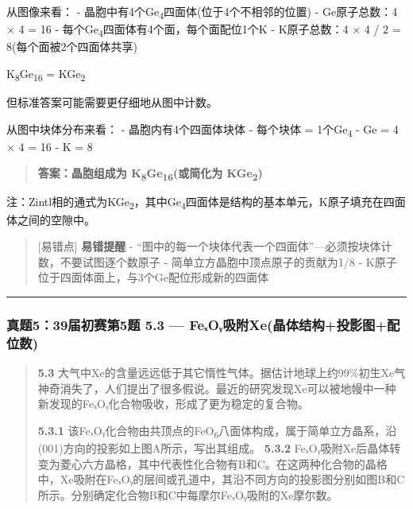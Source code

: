 从图像来看：
- 晶胞中有4个Ge\textsubscript{4}四面体(位于4个不相邻的位置)
- Ge原子总数：4 × 4 = 16
- 每个Ge\textsubscript{4}四面体有4个面，每个面配位1个K
- K原子总数：4 × 4 / 2 = 8(每个面被2个四面体共享)

K\textsubscript{8}Ge\textsubscript{16} = KGe\textsubscript{2}

但标准答案可能需要更仔细地从图中计数。

从图中块体分布来看：
- 晶胞内有4个四面体块体
- 每个块体 = 1个Ge\textsubscript{4}
- Ge = 4 × 4 = 16
- K = 8

\begin{quote}
\textbf{答案：晶胞组成为 K\textsubscript{8}Ge\textsubscript{16}(或简化为 KGe\textsubscript{2})}
\end{quote}

注：Zintl相的通式为KGe\textsubscript{2}，其中Ge\textsubscript{4}四面体是结构的基本单元，K原子填充在四面体之间的空隙中。

\begin{quote}
{[}易错点{]} \textbf{易错提醒}
- ``图中的每一个块体代表一个四面体''---必须按块体计数，不要试图逐个数原子
- 简单立方晶胞中顶点原子的贡献为1/8
- K原子位于四面体面上，与3个Ge配位形成新的四面体
\end{quote}

\begin{center}\rule{0.5\linewidth}{0.5pt}\end{center}

\subsubsection{真题5：39届初赛第5题 5.3 --- FeₓOᵧ吸附Xe(晶体结构+投影图+配位数)}\label{ux771fux9898539ux5c4aux521dux8d5bux7b2c5ux9898-5.3-feux2093oux1d67ux5438ux9644xeux6676ux4f53ux7ed3ux6784ux6295ux5f71ux56feux914dux4f4dux6570}

\begin{quote}
\textbf{5.3} 大气中Xe的含量远远低于其它惰性气体。据估计地球上约99\%初生Xe气神奇消失了，人们提出了很多假说。最近的研究发现Xe可以被地幔中一种新发现的FeₓOᵧ化合物吸收，形成了更为稳定的复合物。

\textbf{5.3.1} 该FeₓOᵧ化合物由共顶点的FeO\textsubscript{6}八面体构成，属于简单立方晶系，沿(001)方向的投影如上图A所示，写出其组成。
\textbf{5.3.2} FeₓOᵧ吸附Xe后晶体转变为菱心六方晶格，其中代表性化合物有B和C。在这两种化合物的晶格中，Xe吸附在FeₓOᵧ的层间或孔道中，其沿不同方向的投影图分别如图B和C所示。分别确定化合物B和C中每摩尔FeₓOᵧ吸附的Xe摩尔数。
\end{quote}

